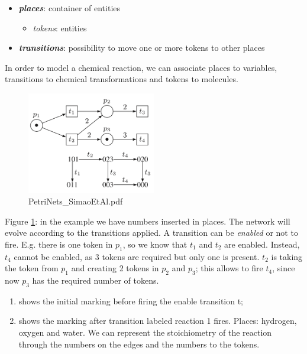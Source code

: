   \begin{itemize}
    \item \textbf{\emph{places}}: container of entities
      \begin{itemize}
        \item \emph{tokens}: entities
      \end{itemize}
    \item \textbf{\emph{transitions}}: possibility to move one or more tokens to other places
  \end{itemize}

\noindent
  In order to model a chemical reaction, we can associate places to variables, transitions to chemical transformations and tokens to molecules.
  \\

  \begin{figure}[h!]
    \centering
    \includegraphics[width=0.5\textwidth]{petri_nets.png}
    \caption{PetriNets\_SimaoEtAl.pdf}
    \label{fig:petri}
  \end{figure}

\noindent
  Figure \ref{fig:petri}: in the example we have numbers inserted in places.
  The network will evolve according to the transitions applied.
  A transition can be \emph{enabled} or not to fire.
  E.g. there is one token in \(p_1\), so we know that \(t_1\) and \(t_2\) are enabled.
  Instead, \(t_4\) cannot be enabled, as 3 tokens are required but only one is present.
  \(t_2\) is taking the token from \(p_1\) and creating 2 tokens in \(p_2\) and \(p_3\); this allows to fire \(t_4\), since now \(p_3\) has the required number of tokens.

  \begin{enumerate}
    \def\labelenumi{(\alph{enumi})}
    \item shows the initial marking before firing the enable transition t;
    \item shows the marking after transition labeled reaction 1 fires.
      Places: hydrogen, oxygen and water.
      We can represent the stoichiometry of the reaction through the numbers on the edges and the numbers to the tokens.
    \end{enumerate}

